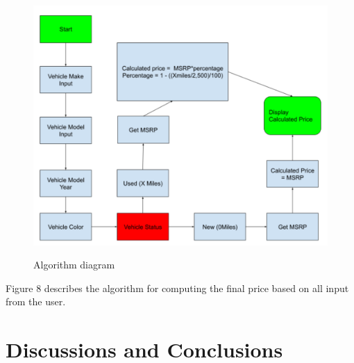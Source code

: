 \documentclass[12pt]{article}
\begin{document}
\begin{figure}[H]
\caption{Algorithm diagram}
\centering
\includegraphics[scale=.25]{figures/canvas.png}\\
\end{figure}
Figure 8 describes the algorithm for computing the final price based on all input from the user. 
\section{Discussions and Conclusions}
\end{document}
